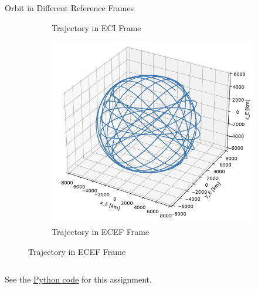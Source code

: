 \begin{hwkProblem}{2}{Orbit in Different Reference Frames}
\begin{figure}[H]
\begin{center}
\begin{subfigure}{0.3\textwidth}
				\caption{Trajectory in ECI Frame}
			\end{subfigure}
			\hfill
			\begin{subfigure}{0.3\textwidth} \label{fig:s02a3}
				\includegraphics[width=\linewidth]{./images/s02a3.png}
				\caption{Trajectory in ECEF Frame}
			\end{subfigure}
		\end{center}
	\end{figure}

	\hwkPart{} \label{hwk:s02b}

	\inputminted{python}{./code/s02b.txt}

	\hwkCode{} \label{code:s02}

	See the \href{https://www.github.com/vaisriv/enae441-hw02/blob/main/code/hw02.py}{Python code} for this assignment.

\end{hwkProblem}

